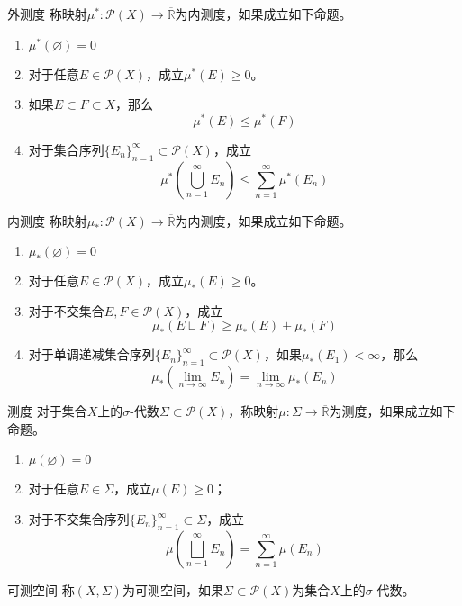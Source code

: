 \documentclass[lang = cn, scheme = chinese, thmcnt = section]{elegantbook}
\newcommand{\R}{\mathbb{R}}            %
\newcommand{\sub}{\subset}             %
\begin{document}
\begin{definition}{外测度}
	称映射$\mu^*:\mathscr{P}(X)\to \overline{\R}$为内测度，如果成立如下命题。
	\begin{enumerate}
		\item $\mu^*(\varnothing)=0$
		\item 对于任意$E\in \mathscr{P}(X)$，成立$\mu^*(E)\ge 0$。
		\item 如果$E\sub F\sub X$，那么
		$$
		\mu^*(E)\le \mu^*(F)
		$$
		\item 对于集合序列$\{E_n\}_{n=1}^{\infty}\sub \mathscr{P}(X)$，成立%
		$$
		\mu^*\left(\bigcup_{n=1}^{\infty}E_n\right)\le\sum_{n=1}^{\infty}\mu^*(E_n)
		$$
	\end{enumerate}
\end{definition}

\begin{definition}{内测度}
	称映射$\mu_*:\mathscr{P}(X)\to \overline{\R}$为内测度，如果成立如下命题。
	\begin{enumerate}
		\item $\mu_*(\varnothing)=0$
		\item 对于任意$E\in \mathscr{P}(X)$，成立$\mu_*(E)\ge 0$。
		\item 对于不交集合$E,F\in \mathscr{P}(X)$，成立%
		$$
		\mu_*(E\sqcup F)\ge \mu_*(E)+\mu_*(F)
		$$
		\item 对于单调递减集合序列$\{E_n\}_{n=1}^{\infty}\sub \mathscr{P}(X)$，如果$\mu_*(E_1)<\infty$，那么%
		$$
		\mu_*\left(\lim_{n\to\infty}E_n\right)=\lim_{n\to\infty}\mu_*(E_n)
		$$
	\end{enumerate}
\end{definition}

\begin{definition}{测度}
	对于集合$X$上的$\sigma$-代数$\Sigma\sub\mathscr{P}(X)$，称映射$\mu:\Sigma\to \overline{\R}$为测度，如果成立如下命题。
	\begin{enumerate}
		\item $\mu(\varnothing)=0$
		\item 对于任意$E\in \Sigma$，成立$\mu(E)\ge 0$；
		\item 对于不交集合序列$\{E_n\}_{n=1}^{\infty}\sub \Sigma$，成立%
		$$
		\mu\left(\bigsqcup_{n=1}^{\infty}E_n\right)=\sum_{n=1}^{\infty}\mu(E_n)
		$$
	\end{enumerate}
\end{definition}

\begin{definition}{可测空间}
	称$(X,\Sigma)$为可测空间，如果$\Sigma\sub\mathscr{P}(X)$为集合$X$上的$\sigma$-代数。
\end{definition}
\end{document}

